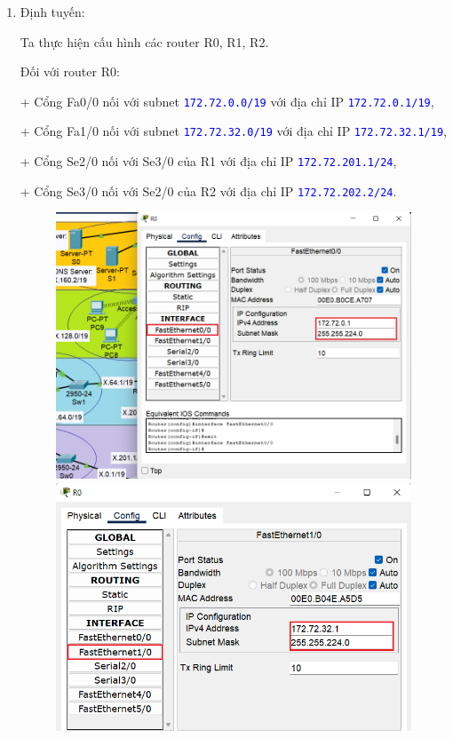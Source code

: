\begin{enumerate}
\begin{enumerate}
\item Định tuyến:

Ta thực hiện cấu hình các router R0, R1, R2.

Đối với router R0: 

+ Cổng Fa0/0 nối với subnet \texttt{\textcolor{blue}{172.72.0.0/19}} với địa chỉ IP \texttt{\textcolor{blue}{172.72.0.1/19}}, 

+ Cổng Fa1/0 nối với subnet \texttt{\textcolor{blue}{172.72.32.0/19}} với địa chỉ IP \texttt{\textcolor{blue}{172.72.32.1/19}}, 

+ Cổng Se2/0 nối với Se3/0 của R1 với địa chỉ IP \texttt{\textcolor{blue}{172.72.201.1/24}}, 

+ Cổng Se3/0 nối với Se2/0 của R2 với địa chỉ IP \texttt{\textcolor{blue}{172.72.202.2/24}}.

\begin{figure}[H]
\begin{center}
\includegraphics[scale=.7]{../figures/p2/routing1}
\includegraphics[scale=.6]{../figures/p2/routing2}

\end{center}
\end{figure}
\end{enumerate}
\end{enumerate}

